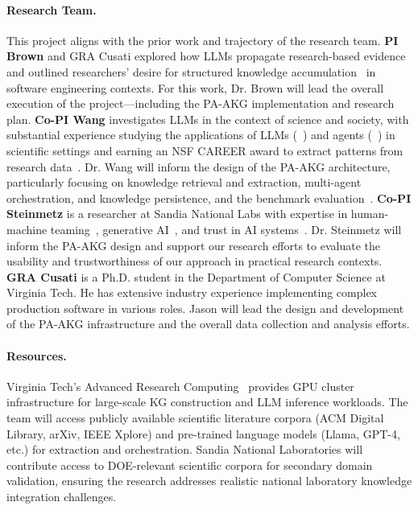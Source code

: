 \documentclass{files/proposalnsf}
\begin{document}
\paragraph{Research Team.} This project aligns with the prior work and trajectory of the research team.
\textbf{PI Brown} and GRA Cusati explored how LLMs propagate research-based evidence~\cite{brown2025esem} and outlined researchers' desire for structured knowledge accumulation~\cite{cusati2026fose} in software engineering contexts. For this work, Dr. Brown will lead the overall execution of the project---including the PA-AKG implementation and research plan. \textbf{Co-PI Wang} investigates LLMs in the context of science and society, with substantial experience studying the applications of LLMs (\ie~\cite{bi2024ai,srivastava2025llmthinkbench}) and agents (\ie~\cite{lu2024triageagent,latimer2025hindsight}) in scientific settings and earning an NSF CAREER award to extract patterns from research data~\cite{wang_career}. Dr. Wang will inform the design of the PA-AKG architecture, particularly focusing on knowledge retrieval and extraction, multi-agent orchestration, and knowledge persistence, and the benchmark evaluation~\cite{srivastava2025beyondbench}. \textbf{Co-PI Steinmetz} is a researcher at Sandia National Labs with expertise in human-machine teaming~\cite{chance2023towards,powell2021coordination}, generative AI~\cite{krofcheck2023overview,layton2025mstd}, and trust in AI systems~\cite{steinmetz2025trust,naugle2025trusted}. Dr. Steinmetz will inform the PA-AKG design and support our research efforts to evaluate the usability and trustworthiness of our approach in practical research contexts. \textbf{GRA Cusati} is a Ph.D. student in the Department of Computer Science at Virginia Tech. He has extensive industry experience implementing complex production software in various roles. Jason will lead the design and development of the PA-AKG infrastructure and the overall data collection and analysis efforts.

\paragraph{Resources.} Virginia Tech's Advanced Research Computing~\cite{} provides GPU cluster infrastructure for large-scale KG construction and LLM inference workloads. The team will access publicly available scientific literature corpora (\eg ACM Digital Library, arXiv, IEEE Xplore) and pre-trained language models (\eg Llama, GPT-4, etc.) for extraction and orchestration. Sandia National Laboratories will contribute access to DOE-relevant scientific corpora for secondary domain validation, ensuring the research addresses realistic national laboratory knowledge integration challenges.



\end{document}
